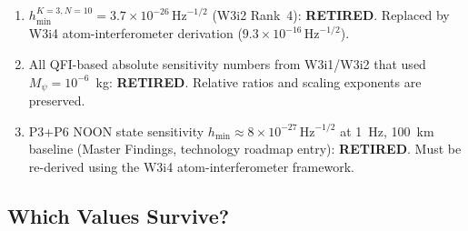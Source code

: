 \documentclass[11pt]{article}
\theoremstyle{definition}
\theoremstyle{remark}
\newcommand{\ee}[1]{\times10^{#1}}
\newcommand{\Meff}{M_{\mathrm{eff}}}
\newcommand{\Mpsi}{M_\psi}
\newcommand{\sqrtHz}{\,\mathrm{Hz}^{-1/2}}
\begin{document}
\begin{tcolorbox}[colback=red!5!white, colframe=red!50!black,
  title=Values Permanently Retired by $\Meff$ Correction]
\begin{enumerate}
\item $h_{\min}^{K=3, N=10} = 3.7\ee{-26}\sqrtHz$ (W3i2 Rank~4):
  \textbf{RETIRED}. Replaced by W3i4 atom-interferometer derivation
  ($9.3\ee{-16}\sqrtHz$).

\item All QFI-based absolute sensitivity numbers from W3i1/W3i2 that used
  $\Mpsi = 10^{-6}$~kg: \textbf{RETIRED}. Relative ratios and scaling
  exponents are preserved.

\item P3+P6 NOON state sensitivity $h_{\min} \approx 8\ee{-27}\sqrtHz$
  at 1~Hz, 100~km baseline (Master Findings, technology roadmap entry):
  \textbf{RETIRED}. Must be re-derived using the W3i4 atom-interferometer
  framework.
\end{enumerate}
\end{tcolorbox}

\subsection{Which Values Survive?}
\end{document}

